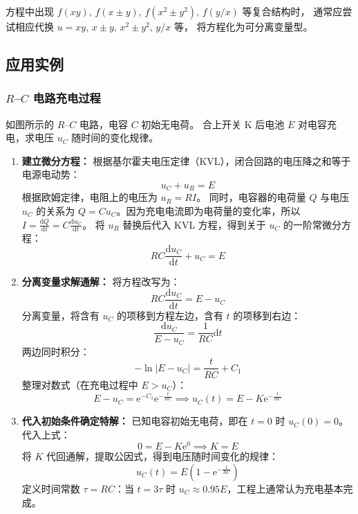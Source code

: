 \documentclass[lang=cn,11pt]{elegantbook}
\begin{document}
\begin{remark}
方程中出现 $f(xy),\,f(x\pm y),\,f(x^2\pm y^2),\,f(y/x)$ 等复合结构时，
通常应尝试相应代换 $u=xy,\,x\pm y,\,x^2\pm y^2,\,y/x$ 等，
将方程化为可分离变量型。
\end{remark}

\subsection{应用实例}

\subsubsection*{$R$--$C$ 电路充电过程}

\begin{exercise} \label{ex:ode-rc-circuit}
如图所示的 $R$--$C$ 电路，电容 $C$ 初始无电荷。
合上开关 K 后电池 $E$ 对电容充电，求电压 $u_C$ 随时间的变化规律。
\end{exercise}

\begin{solution}
\begin{enumerate}
    \item \textbf{建立微分方程：}
    根据基尔霍夫电压定律（KVL），闭合回路的电压降之和等于电源电动势：
    \[
    u_C + u_R = E
    \]
    根据欧姆定律，电阻上的电压为 $u_R = RI$。
    同时，电容器的电荷量 $Q$ 与电压 $u_C$ 的关系为 $Q = Cu_C$。因为充电电流即为电荷量的变化率，所以 $I = \frac{\mathrm{d}Q}{\mathrm{d}t} = C\frac{\mathrm{d}u_C}{\mathrm{d}t}$。
    将 $u_R$ 替换后代入 KVL 方程，得到关于 $u_C$ 的一阶常微分方程：
    \[
    RC\frac{\mathrm{d}u_C}{\mathrm{d}t} + u_C = E
    \]

    \item \textbf{分离变量求解通解：}
    将方程改写为：
    \[
    RC\frac{\mathrm{d}u_C}{\mathrm{d}t} = E - u_C
    \]
    分离变量，将含有 $u_C$ 的项移到方程左边，含有 $t$ 的项移到右边：
    \[
    \frac{\mathrm{d}u_C}{E - u_C} = \frac{1}{RC}\mathrm{d}t
    \]
    两边同时积分：
    \[
    -\ln|E - u_C| = \frac{t}{RC} + C_1
    \]
    整理对数式（在充电过程中 $E > u_C$）：
    \[
    E - u_C = \mathrm{e}^{-C_1} \mathrm{e}^{-\frac{t}{RC}} \implies u_C(t) = E - K\mathrm{e}^{-\frac{t}{RC}}
    \]

    \item \textbf{代入初始条件确定特解：}
    已知电容初始无电荷，即在 $t=0$ 时 $u_C(0) = 0$。代入上式：
    \[
    0 = E - K\mathrm{e}^0 \implies K = E
    \]
    将 $K$ 代回通解，提取公因式，得到电压随时间变化的规律：
    \[
    \boxed{u_C(t) = E\left(1 - \mathrm{e}^{-\frac{t}{RC}}\right)} \tag{5.3}
    \]
    定义时间常数 $\tau=RC$：当 $t=3\tau$ 时 $u_C \approx 0.95E$，工程上通常认为充电基本完成。
\end{enumerate}
\end{solution}
\end{document}
